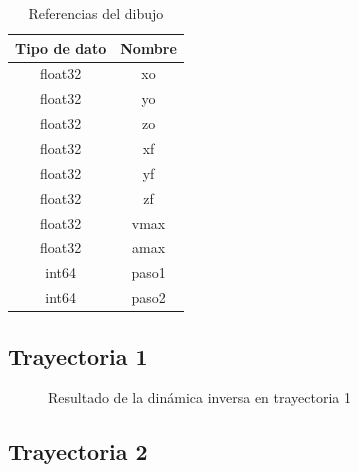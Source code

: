             \begingroup
            \renewcommand{\arraystretch}{1.0}
            \begin{table}[H]
                \centering
                \begin{tabular}{c c}
                   \hline                   \hline
                   \textbf{Tipo de dato}  & \textbf{Nombre}    \\\hline \hline 
                    float32 & xo
                   \\\hline
                    float32 & yo
                   \\\hline
                    float32 & zo
                   \\\hline
                    float32 & xf
                   \\\hline
                    float32 & yf
                   \\\hline
                    float32 & zf
                   \\\hline
                    float32 & vmax
                   \\\hline
                    float32 & amax
                   \\\hline
                    int64 & paso1
                   \\\hline
                    int64 & paso2
                    \\\hline                   \hline
                \end{tabular}
                \caption{Referencias del dibujo}
                \label{tab:cap6_rviz_5_msg}
            \end{table}
        \endgroup   
        \newpage

    \subsection{Trayectoria 1}
    
        \begin{figure}[h]
            \centering
            
            \caption{Resultado de la dinámica inversa en trayectoria 1}
            \label{f:cap7_tray1}
        \end{figure}

                
    \subsection{Trayectoria 2}
    
